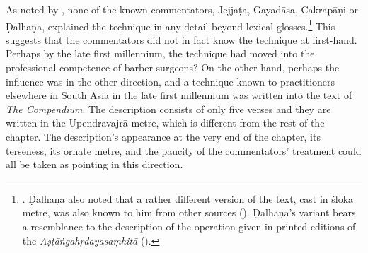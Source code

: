 As noted by \citeauthor{meul-hist}, none of
the known commentators, Jejjaṭa, Gayadāsa, Cakrapāṇi or Ḍalhaṇa, explained the
technique in any detail beyond lexical glosses.\footnote{\cite[IB,
328]{meul-hist}. Ḍalhaṇa also noted that a rather different version of the text,
cast in śloka metre, was also known to him from other sources
().  Ḍalhaṇa's variant bears a resemblance to the 
description
of the operation given in printed editions of the \emph{Aṣṭāṅgahṛdayasaṃhitā}
().} %
This suggests that the commentators did not in fact know the technique at
first-hand. Perhaps by the late first millennium, the technique had moved into the
professional competence of barber-surgeons?  On the other hand, perhaps the
influence was in the other direction, and a technique known to practitioners
elsewhere in South Asia in the late first millennium was written into the text of
\emph{The Compendium}. The description consists of only five verses and they 
are
written in the Upendravajrā metre, which is different from the rest of the
chapter.  The description's appearance at the very end of the chapter, its
terseness, its ornate metre, and the paucity of the commentators' treatment could
all be taken as pointing in this direction.

